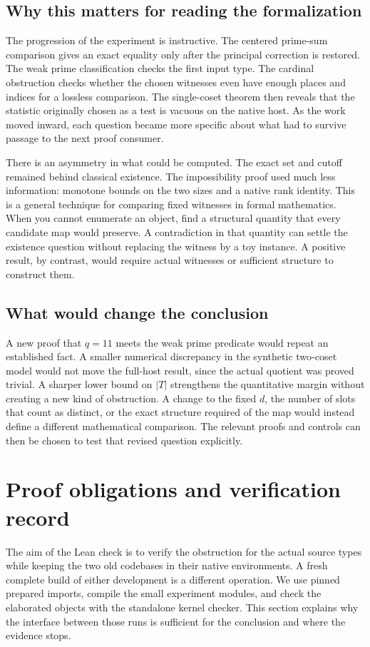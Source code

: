 \documentclass[12pt,letterpaper]{article}
\begin{document}
\subsection{Why this matters for reading the formalization}
The progression of the experiment is instructive. The centered prime-sum comparison gives an exact equality only after the principal correction is restored. The weak prime classification checks the first input type. The cardinal obstruction checks whether the chosen witnesses even have enough places and indices for a lossless comparison. The single-coset theorem then reveals that the statistic originally chosen as a test is vacuous on the native host. As the work moved inward, each question became more specific about what had to survive passage to the next proof consumer.

There is an asymmetry in what could be computed. The exact set and cutoff remained behind classical existence. The impossibility proof used much less information: monotone bounds on the two sizes and a native rank identity. This is a general technique for comparing fixed witnesses in formal mathematics. When you cannot enumerate an object, find a structural quantity that every candidate map would preserve. A contradiction in that quantity can settle the existence question without replacing the witness by a toy instance. A positive result, by contrast, would require actual witnesses or sufficient structure to construct them.

\subsection{What would change the conclusion}
A new proof that $q=11$ meets the weak prime predicate would repeat an established fact. A smaller numerical discrepancy in the synthetic two-coset model would not move the full-host result, since the actual quotient was proved trivial. A sharper lower bound on $|T|$ strengthens the quantitative margin without creating a new kind of obstruction. A change to the fixed $d$, the number of slots that count as distinct, or the exact structure required of the map would instead define a different mathematical comparison. The relevant proofs and controls can then be chosen to test that revised question explicitly.


\section{Proof obligations and verification record}\label{sec:proofaudit}
The aim of the Lean check is to verify the obstruction for the actual source types while keeping the two old codebases in their native environments. A fresh complete build of either development is a different operation. We use pinned prepared imports, compile the small experiment modules, and check the elaborated objects with the standalone kernel checker. This section explains why the interface between those runs is sufficient for the conclusion and where the evidence stops.
\end{document}
